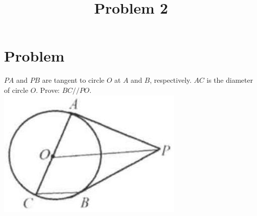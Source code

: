 \documentclass{article}
\title{Problem 2}
\date{}
\begin{document}
\maketitle

\section*{Problem}
\(P A\) and \(P B\) are tangent to circle \(O\) at \(A\) and \(B\), respectively. \(A C\) is the diameter of circle \(O\). Prove: \(B C / / P O\).\\
\centering
\includegraphics[width=\textwidth]{images/169(4).jpg}
\end{document}
